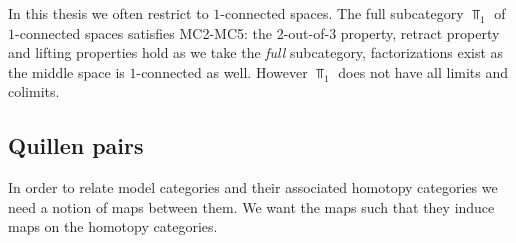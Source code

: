 
In this thesis we often restrict to $1$-connected spaces. The full subcategory $\Top_1$ of $1$-connected spaces satisfies MC2-MC5: the 2-out-of-3 property, retract property and lifting properties hold as we take the \emph{full} subcategory, factorizations exist as the middle space is $1$-connected as well. However $\Top_1$ does not have all limits and colimits.



\subsection{Quillen pairs}
In order to relate model categories and their associated homotopy categories we need a notion of maps between them. We want the maps such that they induce maps on the homotopy categories.

